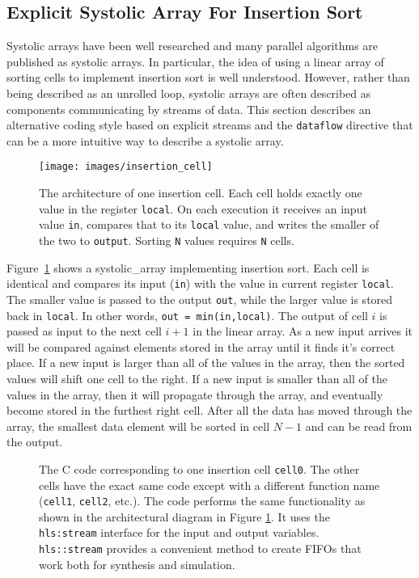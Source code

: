 \subsection{Explicit Systolic Array For Insertion Sort}
\label{sec:insertion_cells}
Systolic arrays have been well researched and many parallel algorithms are published as systolic arrays.  In particular, the idea of using a linear array of sorting cells to implement insertion sort is well understood\cite{ortiz2011streaming, bednara2000tradeoff, marcelino2008sorting, arcas2014empirical}. However, rather than being described as an unrolled loop, systolic arrays are often described as components communicating by streams of data. This section describes an alternative coding style based on explicit streams and the \lstinline{dataflow} directive that can be a more intuitive way to describe a systolic array.
  
\begin{figure}
\centering
\texttt{[image: images/insertion\_cell]}
\caption{ The architecture of one insertion cell. Each cell holds exactly one value in the register \lstinline{local}. On each execution it receives an input value \lstinline{in}, compares that to its \lstinline{local} value, and writes the smaller of the two to \lstinline{output}. Sorting \lstinline{N} values requires \lstinline{N} cells. }
\label{fig:insertion_cell}
\end{figure}

Figure~\ref{fig:insertion_cell} shows a \gls{systolic_array} implementing insertion sort. Each cell is identical and compares its input (\lstinline{in}) with the value in current register \lstinline{local}. The smaller value is passed to the output \lstinline{out}, while the larger value is stored back in \lstinline{local}. In other words, \lstinline{out = min(in,local)}.  The output of cell $i$ is passed as input to the next cell $i+1$ in the linear array. As a new input arrives it will be compared against elements stored in the array until it finds it's correct place.  If a new input is larger than all of the  values in the array, then the sorted values will shift one cell to the right.  If a new input is smaller than all of the values in the array, then it will propagate through the array, and eventually become stored in the furthest right cell. After all the data has moved through the array, the smallest data element will be sorted in cell $N-1$ and can be read from the output. 

\begin{figure}
{\footnotesize }
\caption{  The \VHLS C code corresponding to one insertion cell \lstinline{cell0}. The other cells have the exact same code except with a different function name (\lstinline{cell1}, \lstinline{cell2}, etc.). The code performs the same functionality as shown in the architectural diagram in Figure \ref{fig:insertion_cell}. It uses the \lstinline{hls:stream} interface for the input and output variables. \lstinline{hls::stream} provides a convenient method to create FIFOs that work both for synthesis and simulation. }
\label{fig:insertion_cell_sort.cpp}
\end{figure}

